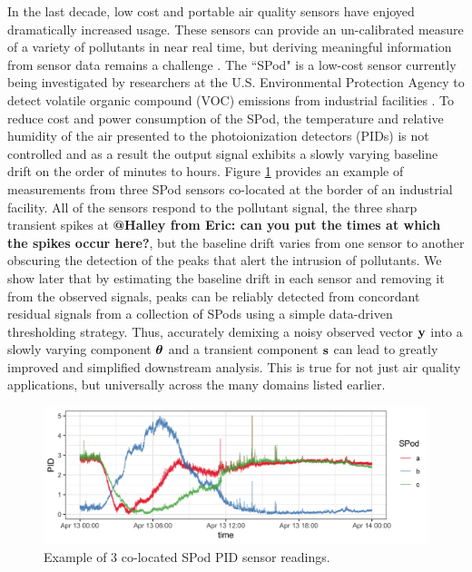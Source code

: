 \documentclass[12pt]{article}
\makeatletter
\newcommand{\Halley}[2]{{\bf {\color{purple}@Halley from #1: #2}}\xspace}
\newcommand{\V}[1]{{\bm{\mathbf{\MakeLowercase{#1}}}}} %
\makeatother
\begin{document}
In the last decade, low cost and portable air quality sensors have enjoyed dramatically increased usage. These sensors can provide an un-calibrated measure of a variety of pollutants in near real time, but deriving meaningful information from sensor data remains a challenge \citep{snyder2013changing}. The ``SPod" is a low-cost sensor currently being investigated by researchers at the U.S. Environmental Protection Agency to detect volatile organic compound (VOC) emissions from industrial facilities \citep{thoma2016south}. To reduce cost and power consumption of the SPod, the temperature and relative humidity of the air presented to the photoionization detectors (PIDs) is not controlled and as a result the output signal exhibits a slowly varying baseline drift on the order of minutes to hours. Figure \ref{fig:raw_spod} provides an example of measurements from three SPod sensors co-located at the border of an industrial facility. All of the sensors respond to the pollutant signal, the three sharp transient spikes at \Halley{Eric}{can you put the times at which the spikes occur here?}, but the baseline drift varies from one sensor to another obscuring the detection of the peaks that alert the intrusion of pollutants. We show later that by estimating the baseline drift in each sensor %
 and  removing it from the observed signals, peaks can be reliably detected from concordant residual signals from a collection of SPods using a simple data-driven thresholding strategy. Thus, accurately demixing a noisy observed vector $\V{y}$ into a slowly varying component $\V{\theta}$ and a transient component $\V{s}$ can lead to greatly improved and simplified downstream analysis. This is true for not just air quality applications, but universally across the many domains listed earlier.

	\begin{figure}[t!]
		\includegraphics[width = \linewidth]{Figures/uncorrected_data.png}		
		\caption{Example of 3 co-located SPod PID sensor readings.}
		\label{fig:raw_spod}
	\end{figure}	
\end{document}

